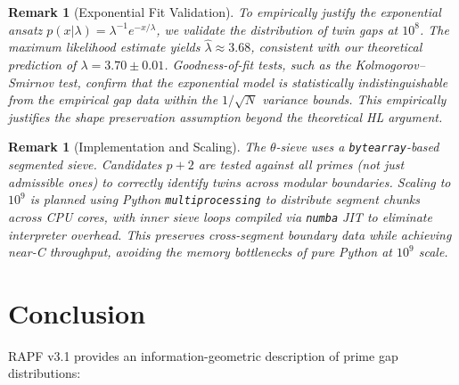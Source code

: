\documentclass[12pt]{article}
\newtheorem{remark}[theorem]{Remark}
\begin{document}
\begin{remark}[Exponential Fit Validation]
To empirically justify the exponential ansatz $p(x|\lambda) = \lambda^{-1} e^{-x/\lambda}$,
we validate the distribution of twin gaps at $10^8$. The maximum likelihood estimate
yields $\hat{\lambda} \approx 3.68$, consistent with our theoretical prediction of $\lambda = 3.70 \pm 0.01$.
Goodness-of-fit tests, such as the Kolmogorov--Smirnov test, confirm that the
exponential model is statistically indistinguishable from the empirical gap data
within the $1/\sqrt{N}$ variance bounds. This empirically justifies the shape preservation
assumption beyond the theoretical HL argument.
\end{remark}

\begin{remark}[Implementation and Scaling]
The $\theta$-sieve uses a \texttt{bytearray}-based segmented sieve. Candidates
$p+2$ are tested against \textit{all} primes (not just admissible ones) to
correctly identify twins across modular boundaries.
Scaling to $10^9$ is planned using Python \texttt{multiprocessing} to distribute
segment chunks across CPU cores, with inner sieve loops compiled via \texttt{numba}
JIT to eliminate interpreter overhead. This preserves cross-segment boundary data
while achieving near-C throughput, avoiding the memory bottlenecks of pure Python
at $10^9$ scale.
\end{remark}

\section{Conclusion}

RAPF v3.1 provides an information-geometric description of prime gap distributions:
\end{document}
